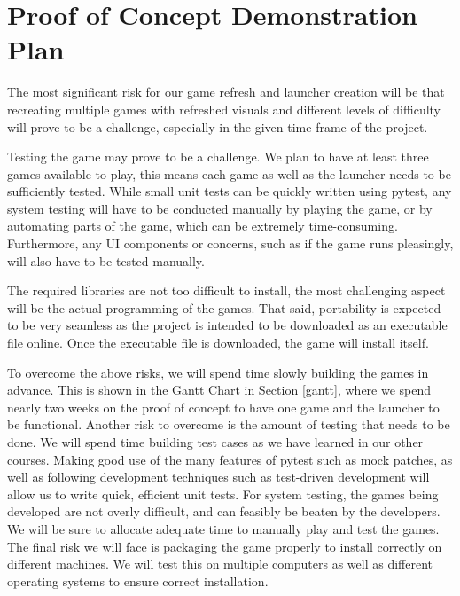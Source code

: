 \documentclass[12pt, titlepage]{article}
\begin{document}
\section{Proof of Concept Demonstration Plan}

The most significant risk for our game refresh and launcher creation will be that recreating multiple games with refreshed visuals and different levels of difficulty will prove to be a challenge, especially in the given time frame of the project.

\iffalse
Also, we may find testing to be in the middle between manageable and complicated. On one hand, running pytest for some unit tests will be simple but on the other, usability tests, such as if the games and launcher will run pleasingly, will need to be conducted manually and may more time than expected.
\fi

Testing the game may prove to be a challenge. We plan to have at least three games available to play, this means each game as well as the launcher needs to be sufficiently tested.  While small unit tests can be quickly written using pytest, any system testing will have to be conducted manually by playing the game, or by automating parts of the game, which can be extremely time-consuming. Furthermore, any UI components or concerns, such as if the game runs pleasingly, will also have to be tested manually.

The required libraries are not too difficult to install, the most challenging aspect will be the actual programming of the games. That said, portability is expected to be very seamless as the project is intended to be downloaded as an executable file online. Once the executable file is downloaded, the game will install itself.

To overcome the above risks, we will spend time slowly building the games in advance. This is shown in the Gantt Chart in Section \ref{gantt}, where we spend nearly two weeks on the proof of concept to have one game and the launcher to be functional. Another risk to overcome is the amount of testing that needs to be done.  We will spend time building test cases as we have learned in our other courses. Making good use of the many features of pytest such as mock patches, as well as following development techniques such as test-driven development will allow us to write quick, efficient unit tests. For system testing, the games being developed are not overly difficult, and can feasibly be beaten by the developers. We will be sure to allocate adequate time to manually play and test the games. The final risk we will face is packaging the game properly to install correctly on different machines. We will test this on multiple computers as well as different operating systems to ensure correct installation.
\end{document}
